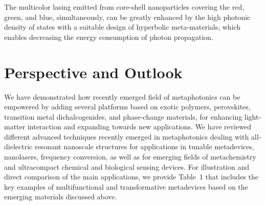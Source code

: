 \documentclass[journal=chreay,manuscript=review]{achemso}
\begin{document}
The multicolor lasing emitted from core-shell nanoparticles covering the red, green, and blue, simultaneously, can be greatly enhanced by the high photonic density of states with a suitable design of hyperbolic meta-materials, which enables decreasing the energy consumption of photon propagation.


\section{Perspective and Outlook}

We have demonstrated how recently emerged field of metaphotonics can be empowered by adding several platforms based on exotic polymers, perovskites, transition metal dichalcogenides, and phase-change materials, for enhancing light-matter interaction and expanding towards new applications. We have reviewed different advanced techniques recently emerged in metaphotonics dealing with all-dielectric resonant nanoscale structures for applications in tunable metadevices, nanolasers, frequency conversion, as well as for emerging fields of metachemistry and ultracompact chemical and biological sensing devices. For illustration and direct comparison of the main applications, we provide Table~1 that includes the key examples of multifunctional and transformative metadevices based on the emerging materials discussed above.
\end{document}

